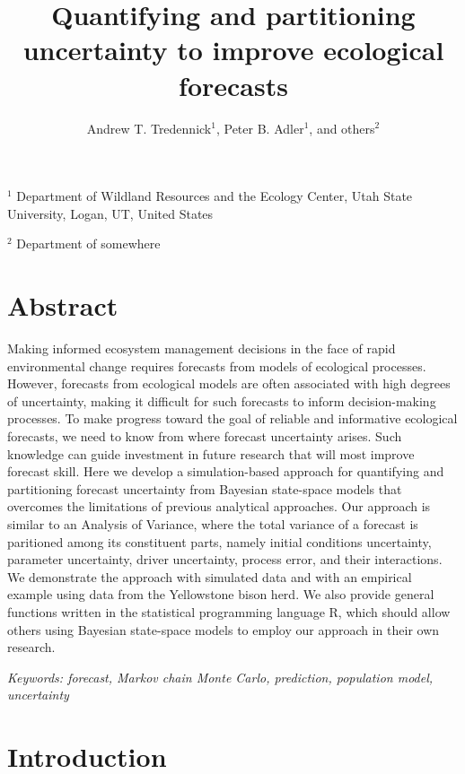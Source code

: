 \documentclass[12pt,]{article}
\title{Quantifying and partitioning uncertainty to improve ecological forecasts}
\author{Andrew T. Tredennick\(^{1}\), Peter B. Adler\(^1\), and others\(^{2}\)}
\date{}
\begin{document}
\maketitle

\setlength{\abovedisplayskip}{0pt} \raggedright

\(^1\) Department of Wildland Resources and the Ecology Center, Utah
State University, Logan, UT, United States

\(^2\) Department of somewhere

\section{Abstract}\label{abstract}

Making informed ecosystem management decisions in the face of rapid
environmental change requires forecasts from models of ecological
processes. However, forecasts from ecological models are often
associated with high degrees of uncertainty, making it difficult for
such forecasts to inform decision-making processes. To make progress
toward the goal of reliable and informative ecological forecasts, we
need to know from where forecast uncertainty arises. Such knowledge can
guide investment in future research that will most improve forecast
skill. Here we develop a simulation-based approach for quantifying and
partitioning forecast uncertainty from Bayesian state-space models that
overcomes the limitations of previous analytical approaches. Our
approach is similar to an Analysis of Variance, where the total variance
of a forecast is paritioned among its constituent parts, namely initial
conditions uncertainty, parameter uncertainty, driver uncertainty,
process error, and their interactions. We demonstrate the approach with
simulated data and with an empirical example using data from the
Yellowstone bison herd. We also provide general functions written in the
statistical programming language R, which should allow others using
Bayesian state-space models to employ our approach in their own
research.

\emph{Keywords: forecast, Markov chain Monte Carlo, prediction,
population model, uncertainty}

\section{Introduction}\label{introduction}
\end{document}
